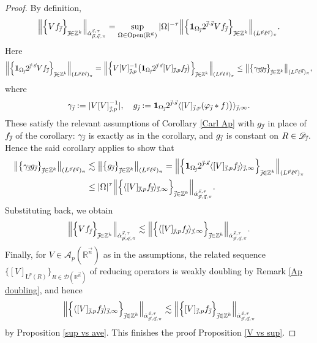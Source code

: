 \documentclass[11pt, reqno]{amsart}
\theoremstyle{definition}
\theoremstyle{remark}
\numberwithin{equation}{section}
\newcommand{\A}{\mathscr A}
\newcommand{\D}{\mathscr D}
\newcommand{\R}{\mathbb R}
\newcommand{\Z}{\mathbb Z}
\newcommand{\vj}{\vec{\textit{\j}}}
\newcommand{\vn}{\vec n}
\newcommand{\vp}{\vec p}
\newcommand{\vq}{\vec q}
\newcommand{\vs}{\vec s}
\newcommand{\aatau}{\dot{\alpha}^{\vs,\tau}_{\vp,\vq,\pi}}
\newcommand{\one}{\mathbf{1}}
\newcommand{\aveL}{\textit{\L}}
\newcommand{\Ave}[3]{\langle#1\rangle_{#2,#3}}
\newcommand{\Red}[3]{[#1]_{#2,#3}}
\newcommand{\abs}[1]{|#1|}
\newcommand{\bNorm}[2]{\big\|#1\big\|_{#2}}
\newcommand{\BNorm}[2]{\Big\|#1\Big\|_{#2}}
\newcommand{\Open}{\mathrm{Open}}
\begin{document}
\begin{proof}
By definition,
\begin{equation*}
\BNorm{\Big\{ Vf_{\vj} \Big\}_{\vj\in\Z^k}}{\aatau}
=\sup_{\Omega\in\Open(\R^{\vn})}\abs{\Omega}^{-\tau}\BNorm{\Big\{ \one_{\Omega_{\vj}}2^{\vj\cdot\vs}Vf_{\vj} \Big\}_{\vj\in\Z^k}}{(L^{\vp}\ell^{\vq})_\pi }.
\end{equation*}
Here
\begin{align*}
\BNorm{\Big\{ \one_{\Omega_{\vj}}2^{\vj\cdot\vs}Vf_{\vj} \Big\}_{\vj\in\Z^k}}{(L^{\vp}\ell^{\vq})_\pi }
=\BNorm{\Big\{ V\Red{V}{\vj}{p}^{-1} \big(\one_{\Omega_{\vj}}2^{\vj\cdot\vs}\Red{V}{\vj}{p}f_{\vj}\big) \Big\}_{\vj\in\Z^k}}{(L^{\vp}\ell^{\vq})_\pi }
\leq\bNorm{\big\{ \gamma_{\vj} g_{\vj} \big\}_{\vj\in\Z^k}}{(L^{\vp}\ell^{\vq})_\pi },
\end{align*}
where
\begin{equation*}
\gamma_{\vj}:= \abs{V\Red{V}{\vj}{p}^{-1}},\quad g_{\vj}:=\one_{\Omega_{\vj}}2^{\vj\cdot\vs}\Ave{\Red{V}{\vj}{p}(\varphi_{\vj}*f)\big)}{\vj}{\infty}.
\end{equation*}
These satisfy the relevant assumptions of Corollary \ref{Carl Ap} with $g_{\vj}$ in place of $f_{\vj}$ of the corollary: $\gamma_{\vj}$ is exactly as in the corollary, and $g_{\vj}$ is constant on $R\in\mathscr D_{\vj}$. Hence the said corollary applies to show that
\begin{equation*}
\begin{split}
\bNorm{\big\{ \gamma_{\vj} g_{\vj} \big\}_{\vj\in\Z^k}}{(L^{\vp}\ell^{\vq})_\pi }
&\lesssim\bNorm{\big\{ g_{\vj} \big\}_{\vj\in\Z^k}}{(L^{\vp}\ell^{\vq})_\pi }
=\BNorm{\Big\{ \one_{\Omega_{\vj}}2^{\vj\cdot\vs}\Ave{\Red{V}{\vj}{p}f_{\vj}}{\vj}{\infty} \Big\}_{\vj\in\Z^k}}{(L^{\vp}\ell^{\vq})_\pi }\\
&\leq\abs{\Omega}^{\tau}\BNorm{\Big\{ \Ave{\Red{V}{\vj}{p}f_{\vj}}{\vj}{\infty} \Big\}_{\vj\in\Z^k}}{\aatau}.
\end{split}
\end{equation*}
Substituting back, we obtain
\begin{equation*}
\BNorm{\Big\{ Vf_{\vj} \Big\}_{\vj\in\Z^k}}{\aatau}
\lesssim\BNorm{\Big\{ \Ave{\Red{V}{\vj}{p}f_{\vj}}{\vj}{\infty} \Big\}_{\vj\in\Z^k}}{\aatau}.
\end{equation*}
Finally, for $V\in\A_p(\R^{\vn})$ as in the assumptions, the related
sequence $\{[V]_{\aveL^p(R)}\}_{R\in\D(\R^{\vn})}$ of reducing operators
is weakly doubling by Remark \ref{Ap doubling}, and hence
\begin{equation*}
\BNorm{\Big\{ \Ave{\Red{V}{\vj}{p}f_{\vj}}{\vj}{\infty} \Big\}_{\vj\in\Z^k}}{\aatau}
\lesssim  \BNorm{\Big\{ \Red{V}{\vj}{p}f_{\vj}\Big\}_{\vj\in\Z^k}}{\aatau}
\end{equation*}
by Proposition \ref{sup vs ave}.
This finishes the proof Proposition \ref{V vs sup}.
\end{proof}
\end{document}
